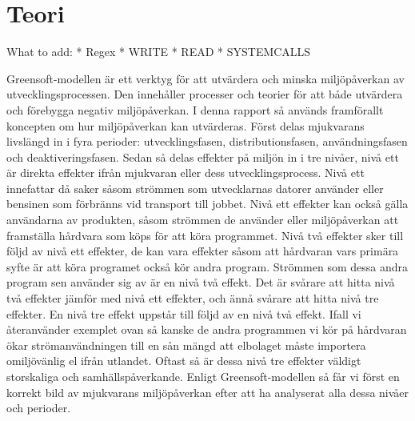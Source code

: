 \section{Teori}
\label{sec:joel_a-theory}

What to add:
* Regex
* WRITE
* READ
* SYSTEMCALLS


Greensoft-modellen är ett verktyg för att utvärdera och minska miljöpåverkan av utvecklingsprocessen. Den innehåller processer och teorier för att både utvärdera och förebygga negativ miljöpåverkan. I denna rapport så används framförallt koncepten om hur miljöpåverkan kan utvärderas. Först delas mjukvarans livslängd in i fyra perioder: utvecklingsfasen, distributionsfasen, användningsfasen och deaktiveringsfasen. Sedan så delas effekter på miljön in i tre nivåer, nivå ett är direkta effekter ifrån mjukvaran eller dess utvecklingsprocess. Nivå ett innefattar då saker såsom strömmen som utvecklarnas datorer använder eller bensinen som förbränns vid transport till jobbet. Nivå ett effekter kan också gälla användarna av produkten, såsom strömmen de använder eller miljöpåverkan att framställa hårdvara som köps för att köra programmet. Nivå två effekter sker till följd av nivå ett effekter, de kan vara effekter såsom att hårdvaran vars primära syfte är att köra programet också kör andra program. Strömmen som dessa andra program sen använder sig av är en nivå två effekt. Det är svårare att hitta nivå två effekter jämför med nivå ett effekter, och ännå svårare att hitta nivå tre effekter. En nivå tre effekt uppstår till följd av en nivå två effekt. Ifall vi återanvänder exemplet ovan så kanske de andra programmen vi kör på hårdvaran ökar strömanvändningen till en sån mängd att elbolaget måste importera omiljövänlig el ifrån utlandet. Oftast så är dessa nivå tre effekter väldigt storskaliga och samhällspåverkande. Enligt Greensoft-modellen så får vi först en korrekt bild av mjukvarans miljöpåverkan efter att ha analyserat alla dessa nivåer och perioder. 